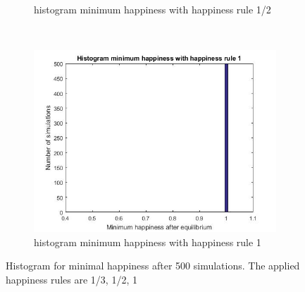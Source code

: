 \begin{figure}[H]
\begin{subfigure}{0.32\textwidth}
        \caption{histogram minimum happiness with happiness rule 1/2}
        \label{fig:tiger}
    \end{subfigure}
    ~ %
    \begin{subfigure}{0.32\textwidth}
        \includegraphics[width=\textwidth]{histogram_min_happiness_een}
        \caption{histogram minimum happiness with happiness rule 1}
        \label{minimal happiness 1}
    \end{subfigure}
    \caption{Histogram for minimal happiness after 500 simulations. The applied happiness rules are 1/3, 1/2, 1 }
    \label{minhappy}
\end{figure}
